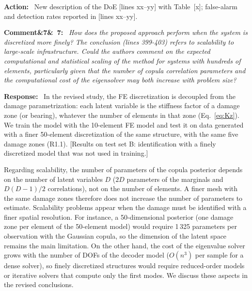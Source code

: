 \documentclass[11pt]{article}
\newenvironment{rcomment}[1]{\par\bigskip\noindent\textbf{Comment\ifx&#1&\else\ #1\fi:}\ \itshape}{\par}
\newenvironment{response}{\par\smallskip\noindent\color{resp}\textbf{Response:}\ }{\par}
\newenvironment{action}{\par\smallskip\noindent\color{resp}\textbf{Action:}\ }{\par}
\newcommand{\tbd}[1]{\textcolor{note}{\textsf{[#1]}}}
\newcommand{\lines}[1]{\tbd{lines #1}}
\begin{document}
\begin{action}
New description of the DoE \lines{xx--yy} with Table~\tbd{x}; false-alarm and detection rates reported in
\lines{xx--yy}.
\end{action}

\begin{rcomment}{7}
How does the proposed approach perform when the system is discretized more finely? The conclusion (lines 399-403)
refers to scalability to large-scale infrastructure. Could the authors comment on the expected computational and
statistical scaling of the method for systems with hundreds of elements, particularly given that the number of copula
correlation parameters and the computational cost of the eigensolver may both increase with problem size?
\end{rcomment}

\begin{response}
In the revised study, the FE discretization is decoupled from the damage parametrization: each latent variable is the
stiffness factor of a damage zone (or bearing), whatever the number of elements in that zone (Eq.~\eqref{eq:Kz}). We train
the model with the 10-element FE model and test it on data generated with a finer 50-element discretization of the same
structure, with the same five damage zones (R1.1).
\tbd{Results on test set B: identification with a finely discretized model that was not used in training.}

Regarding scalability, the number of parameters of the copula posterior depends on the number of latent variables $D$
($2D$ parameters of the marginals and $D(D-1)/2$ correlations), not on the number of elements. A finer mesh with the same
damage zones therefore does not increase the number of parameters to estimate. Scalability problems appear when the damage
must be identified with a finer spatial resolution. For instance, a 50-dimensional posterior (one damage zone per element of
the 50-element model) would require 1\,325 parameters per observation with the Gaussian copula, so the dimension of the latent space
remains the main limitation. On the other hand, the cost of the
eigenvalue solver grows with the number of DOFs of the decoder model ($O(n^3)$ per sample for a dense solver), so finely
discretized structures would require reduced-order models or iterative solvers that compute only the first modes. We
discuss these aspects in the revised conclusions.
\end{response}
\end{document}
